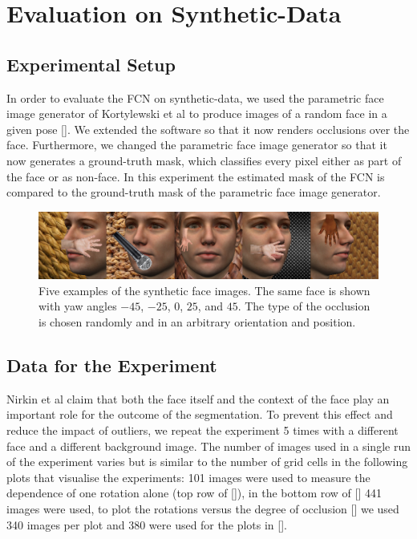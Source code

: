 \FloatBarrier

\section{Evaluation on Synthetic-Data}
\subsection{Experimental Setup}
In order to evaluate the FCN on synthetic-data, we used the parametric face image generator of Kortylewski et al \cite{parametric} to produce images of a random face in a given pose []. We extended the software so that it now renders occlusions over the face. Furthermore, we changed the parametric face image generator so that it now generates a ground-truth mask, which classifies every pixel either as part of the face or as non-face. In this experiment the estimated mask of the FCN is compared to the ground-truth mask of the parametric face image generator.

\begin{figure}[H]
	\centering
	\includegraphics[width=\textwidth]{Figures/chap2/syntheticData_samples.png}
	\caption{Five examples of the synthetic face images. The same face is shown with yaw angles $-45$\textdegree, $-25$\textdegree, $0$\textdegree, $25$\textdegree, and $45$\textdegree. The type of the occlusion is chosen randomly and in an arbitrary orientation and position.}
	\label{fig:syntheticData_samples}
\end{figure}

\subsection{Data for the Experiment}
Nirkin et al \cite{nirkin2018_faceswap} claim that both the face itself and the context of the face play an important role for the outcome of the segmentation. To prevent this effect and reduce the impact of outliers, we repeat the experiment 5 times with a different face and a different background image. The number of images used in a single run of the experiment varies but is similar to the number of grid cells in the following plots that visualise the experiments: 101 images were used to measure the dependence of one rotation alone (top row of []), in the bottom row of [] 441 images were used, to plot the rotations versus the degree of occlusion [] we used 340 images per plot and 380 were used for the plots in [].


